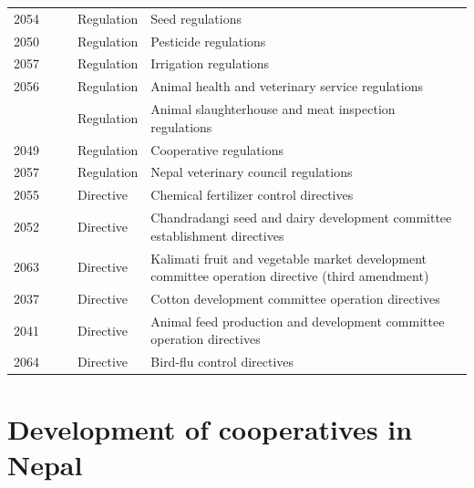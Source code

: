 \documentclass[
  openany]{book}
\begin{document}
\begin{longtable}[t]{rrrl>{\raggedright\arraybackslash}p{16em}}
2054 &  &  & Regulation & Seed regulations\\
\rowcolor{gray!6}  2050 &  &  & Regulation & Pesticide regulations\\
2057 &  &  & Regulation & Irrigation regulations\\
\rowcolor{gray!6}  2056 &  &  & Regulation & Animal health and veterinary service regulations\\
\addlinespace
2056 &  &  & Regulation & Animal slaughterhouse and meat inspection regulations\\
\rowcolor{gray!6}  2049 &  &  & Regulation & Cooperative regulations\\
2057 &  &  & Regulation & Nepal veterinary council regulations\\
\rowcolor{gray!6}  2055 &  &  & Directive & Chemical fertilizer control directives\\
2052 &  &  & Directive & Chandradangi seed and dairy development committee establishment directives\\
\addlinespace
\rowcolor{gray!6}  2063 &  &  & Directive & Kalimati fruit and vegetable market development committee operation directive (third amendment)\\
2037 &  &  & Directive & Cotton development committee operation directives\\
\rowcolor{gray!6}  2041 &  &  & Directive & Animal feed production and development committee operation directives\\
2064 &  &  & Directive & Bird-flu control directives\\
\bottomrule
\end{longtable}
\endgroup{}

\hypertarget{development-of-cooperatives-in-nepal}{%
\section{Development of cooperatives in Nepal}\label{development-of-cooperatives-in-nepal}}
\end{document}

